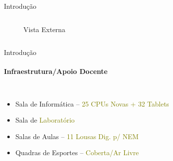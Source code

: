 \documentclass[aspectratio=169]{beamer}
\begin{document}
\begin{frame}{Introdução}
\begin{columns}
\begin{figure}[htb!]
{				\caption{Vista Externa}
			}
		\end{figure}
	\end{columns}
\end{frame}

\begin{frame}{Introdução}
	\framesubtitle{Infraestrutura/Apoio Docente}
	\begin{columns}
		\begin{itemize}
			\item Sala de Informática -- \textcolor<1>{olive}{25 CPUs Novas + 32 Tablets}
			\item<2-> Sala de \textcolor<2>{olive}{Laboratório}
			\item<3-> Salas de Aulas --  \textcolor<3>{olive}{11 Lousas Dig. p/ NEM}
			\item<4-> Quadras de Esportes -- \textcolor<4>{olive}{Coberta/Ar Livre}
		\end{itemize}


\end{columns}
\end{frame}
\end{document}
